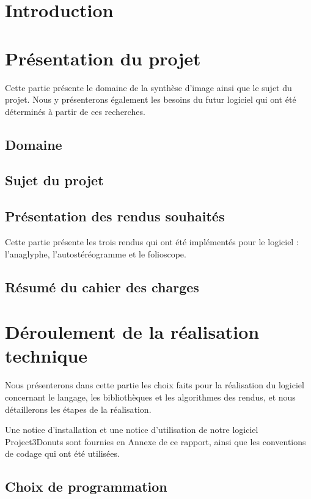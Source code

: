 \documentclass[paper=a4, fontsize=12pt]{article}
\newenvironment{changemargin}[2]{\begin{list}{}{%
      \setlength{\topsep}{0pt}%
      \setlength{\leftmargin}{0pt}%
      \setlength{\rightmargin}{0pt}%
      \setlength{\listparindent}{\parindent}%
      \setlength{\itemindent}{\parindent}%
      \setlength{\parsep}{0pt plus 1pt}%
      \addtolength{\leftmargin}{#1}%
      \addtolength{\rightmargin}{#2}%
    }\item }{\end{list}}
\numberwithin{equation}{section}		%
\numberwithin{figure}{section}			%
\numberwithin{table}{section}				%
\begin{document}
\begin{changemargin}{-1cm}{-1cm}

  \section{Introduction}
  
  \newpage

  \section{Présentation du projet}
  Cette partie présente le domaine de la synthèse d'image ainsi que le sujet du projet. Nous y présenterons également les besoins du futur logiciel qui ont été déterminés à partir de ces recherches.
  \subsection{Domaine}
  
  \subsection{Sujet du projet}
  
  \subsection{Présentation des rendus souhaités}
  Cette partie présente les trois rendus qui ont été implémentés pour le logiciel : l'anaglyphe, l'autostéréogramme et le folioscope.
  
  \subsection{Résumé du cahier des charges}
  
  \newpage


  \section{Déroulement de la réalisation technique}
  Nous présenterons dans cette partie les choix faits pour la réalisation du logiciel concernant le langage, les bibliothèques et les algorithmes des rendus, et nous détaillerons les étapes de la réalisation.

  Une notice d'installation et une notice d'utilisation de notre logiciel Project3Donuts sont fournies en Annexe de ce rapport, ainsi que les conventions de codage qui ont été utilisées.

  \subsection{Choix de programmation}
  

\end{changemargin}
\end{document}
